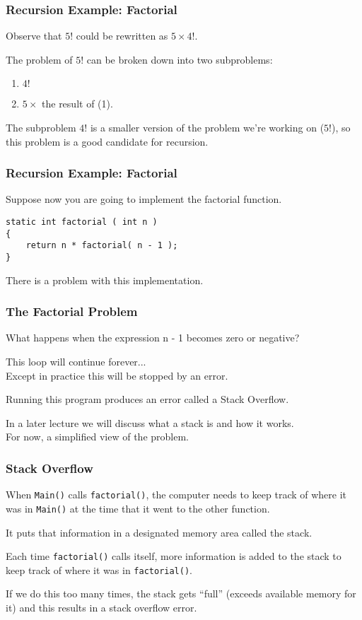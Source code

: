 \begin{frame}
\frametitle{Recursion Example: Factorial}

Observe that $5!$ could be rewritten as $5 \times 4!$.

The problem of $5!$ can be broken down into two subproblems:

\begin{enumerate}
	\item $4!$
	\item $5 \times$ the result of (1).
\end{enumerate}

The subproblem $4!$ is a smaller version of the problem we're working on ($5!$), so this problem is a good candidate for recursion.

\end{frame}

\begin{frame}[fragile]
\frametitle{Recursion Example: Factorial}
Suppose now you are going to implement the factorial function.

\begin{verbatim}
static int factorial ( int n )
{
    return n * factorial( n - 1 );
}
\end{verbatim}

There is a problem with this implementation. 

\end{frame}

\begin{frame}
\frametitle{The Factorial Problem}

What happens when the expression n - 1 becomes zero or negative?

This loop will continue forever...\\
\quad Except in practice this will be stopped by an error.

Running this program produces an error called a \alert{Stack Overflow}.

In a later lecture we will discuss what a stack is and how it works.\\
\quad For now, a simplified view of the problem.


\end{frame}

\begin{frame}
\frametitle{Stack Overflow}

When \texttt{Main()} calls \texttt{factorial()}, the computer needs to keep track of where it was in \texttt{Main()} at the time that it went to the other function.

It puts that information in a designated memory area called the stack.

Each time \texttt{factorial()} calls itself, more information is added to the stack to keep track of where it was in \texttt{factorial()}.

If we do this too many times, the stack gets ``full'' (exceeds available memory for it) and this results in a stack overflow error.

\end{frame}

